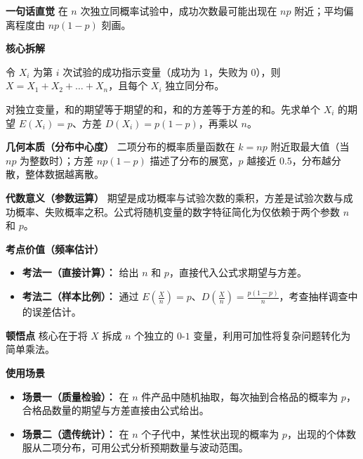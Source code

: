 \begin{explanationbox}
	\textbf{\textcolor{CExplanation}{一句话直觉}}
	在 $n$ 次独立同概率试验中，成功次数最可能出现在 $np$ 附近；平均偏离程度由 $np(1-p)$ 刻画。

	\medskip
	\textbf{\textcolor{CExplanation}{核心拆解}}
	\begin{description}[style=nextline, leftmargin=2.8em, labelsep=0.5em, itemsep=0.45em]
		\item[\textbf{要点一（分解为指示变量）：}]
			令 $X_i$ 为第 $i$ 次试验的成功指示变量（成功为 $1$，失败为 $0$），则 $X = X_1+X_2+\dots+X_n$，且每个 $X_i$ 独立同分布。
		\item[\textbf{要点二（期望可加性）：}]
			对独立变量，和的期望等于期望的和，和的方差等于方差的和。先求单个 $X_i$ 的期望 $E(X_i)=p$、方差 $D(X_i)=p(1-p)$，再乘以 $n$。
	\end{description}

	\medskip
	\textbf{\textcolor{CExplanation}{几何本质（分布中心度）}}
	二项分布的概率质量函数在 $k=np$ 附近取最大值（当 $np$ 为整数时）；方差 $np(1-p)$ 描述了分布的展宽，$p$ 越接近 $0.5$，分布越分散，整体数据越离散。

	\medskip
	\textbf{\textcolor{CExplanation}{代数意义（参数运算）}}
	期望是成功概率与试验次数的乘积，方差是试验次数与成功概率、失败概率之积。公式将随机变量的数字特征简化为仅依赖于两个参数 $n$ 和 $p$。

	\medskip
	\textbf{\textcolor{CExplanation}{考点价值（频率估计）}}
	\begin{itemize}[leftmargin=*, itemsep=0.5em, topsep=0.4em]
		\item \textbf{考法一（直接计算）：} 给出 $n$ 和 $p$，直接代入公式求期望与方差。
		\item \textbf{考法二（样本比例）：} 通过 $E(\frac{X}{n})=p$、$D(\frac{X}{n})=\frac{p(1-p)}{n}$，考查抽样调查中的误差估计。
	\end{itemize}

	\medskip
	\textbf{\textcolor{CExplanation}{顿悟点}}
	核心在于将 $X$ 拆成 $n$ 个独立的 $0$-$1$ 变量，利用可加性将复杂问题转化为简单乘法。

	\medskip
	\textbf{\textcolor{CExplanation}{使用场景}}
	\begin{itemize}[leftmargin=*, itemsep=0.5em, topsep=0.4em]
		\item \textbf{场景一（质量检验）：} 在 $n$ 件产品中随机抽取，每次抽到合格品的概率为 $p$，合格品数量的期望与方差直接由公式给出。
		\item \textbf{场景二（遗传统计）：} 在 $n$ 个子代中，某性状出现的概率为 $p$，出现的个体数服从二项分布，可用公式分析预期数量与波动范围。
	\end{itemize}

\end{explanationbox}
